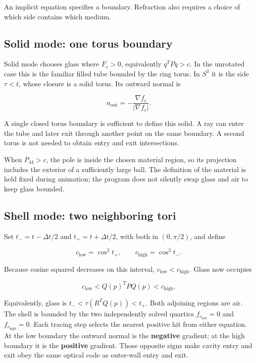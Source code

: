 \documentclass[11pt,a4paper]{article}
\begin{document}
An implicit equation specifies a boundary. Refraction also requires a
choice of which side contains which medium.

\subsection{Solid mode: one torus
boundary}\label{solid-mode-one-torus-boundary}

Solid mode chooses glass where \(F_c>0\), equivalently \(q^TPq>c\). In
the unrotated case this is the familiar filled tube bounded by the ring
torus. In \(S^3\) it is the side \(\tau<t\), whose closure is a solid
torus. Its outward normal is

\[
n_{\mathrm{out}}=-\frac{\nabla f_c}{|\nabla f_c|}.
\]

A single closed torus boundary is sufficient to define this solid. A ray
can enter the tube and later exit through another point on the same
boundary. A second torus is not needed to obtain entry and exit
intersections.

When \(P_{44}>c\), the pole is inside the chosen material region, so its
projection includes the exterior of a sufficiently large ball. The
definition of the material is held fixed during animation; the program
does not silently swap glass and air to keep glass bounded.

\subsection{Shell mode: two neighboring
tori}\label{shell-mode-two-neighboring-tori}

Set \(t_-=t-\Delta t/2\) and \(t_+=t+\Delta t/2\), with both in
\((0,\pi/2)\), and define

\[
c_{\mathrm{low}}=\cos^2t_+,\qquad c_{\mathrm{high}}=\cos^2t_-.
\]

Because cosine squared decreases on this interval,
\(c_{\mathrm{low}}<c_{\mathrm{high}}\). Glass now occupies

\[
\boxed{c_{\mathrm{low}}<Q(p)^TPQ(p)<c_{\mathrm{high}}.}
\]

Equivalently, glass is \(t_-<\tau(R^TQ(p))<t_+\). Both adjoining regions
are air. The shell is bounded by the two independently solved quartics
\(f_{c_{\mathrm{low}}}=0\) and \(f_{c_{\mathrm{high}}}=0\). Each tracing
step selects the nearest positive hit from either equation. At the low
boundary the outward normal is the \textbf{negative} gradient; at the
high boundary it is the \textbf{positive} gradient. Those opposite signs
make cavity entry and exit obey the same optical code as outer-wall
entry and exit.
\end{document}
